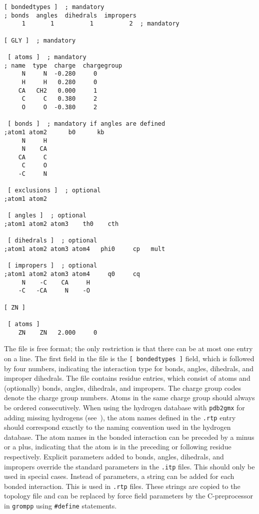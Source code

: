 {\small
\begin{verbatim}
[ bondedtypes ]  ; mandatory
; bonds  angles  dihedrals  impropers
     1       1          1          2  ; mandatory

[ GLY ]  ; mandatory

 [ atoms ]  ; mandatory 
; name  type  charge  chargegroup 
     N     N  -0.280     0
     H     H   0.280     0
    CA   CH2   0.000     1
     C     C   0.380     2
     O     O  -0.380     2

 [ bonds ]  ; mandatory if angles are defined
;atom1 atom2      b0      kb
     N     H
     N    CA
    CA     C
     C     O
    -C     N

 [ exclusions ]  ; optional
;atom1 atom2

 [ angles ]  ; optional
;atom1 atom2 atom3    th0    cth

 [ dihedrals ]  ; optional
;atom1 atom2 atom3 atom4   phi0     cp   mult

 [ impropers ]  ; optional
;atom1 atom2 atom3 atom4     q0     cq
     N    -C    CA     H
    -C   -CA     N    -O

[ ZN ]

 [ atoms ]
    ZN    ZN   2.000     0
\end{verbatim}}

The file is free format; the only restriction is that there can be at
most one entry on a line.  The first field in the file is the
{\tt [~bondedtypes~]} field, which is followed by four numbers,
indicating the interaction type for bonds, angles, dihedrals, and
improper dihedrals.  The file contains residue entries, which consist
of atoms and (optionally) bonds, angles, dihedrals, and impropers.  The
charge group codes denote the charge group numbers. Atoms in the same
charge group should always be ordered consecutively. When using the
hydrogen database with {\tt pdb2gmx} for adding missing hydrogens
(see~), the atom names defined in the {\tt .rtp} entry
should correspond exactly to the naming convention used in the
hydrogen database. The atom names in the bonded interaction can be
preceded by a minus or a plus, indicating that the atom is in the
preceding or following residue respectively.  Explicit parameters added
to bonds, angles, dihedrals, and impropers override
the standard parameters in the {\tt .itp} files.  This should only be
used in special cases. Instead of parameters, a string can be added
for each bonded interaction.  This is used in  {\tt .rtp}
files. These strings are copied to the topology file and can be
replaced by force field parameters by the C-preprocessor in {\tt grompp}
using {\tt \#define} statements.

